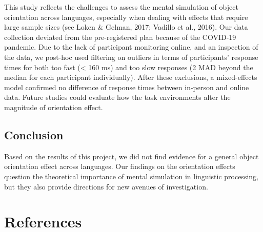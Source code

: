 \documentclass[
  man,floatsintext]{apa7}
\begin{document}
This study reflects the challenges to assess the mental simulation of
object orientation across languages, especially when dealing with
effects that require large sample sizes (see Loken \& Gelman, 2017; Vadillo et al., 2016). Our data collection deviated from
the pre-registered plan because of the COVID-19 pandemic. Due to the
lack of participant monitoring online, and an inspection of the data, we
post-hoc used filtering on outliers in terms of participants' response
times for both too fast (\textless{} 160 ms) and too slow responses (2 MAD beyond
the median for each participant individually). After these exclusions, a
mixed-effects model confirmed no difference of response times between
in-person and online data. Future studies could evaluate how the task
environments alter the magnitude of orientation effect.

\hypertarget{conclusion}{%
\subsection{Conclusion}\label{conclusion}}

Based on the results of this project, we did not find evidence for a
general object orientation effect across languages. Our findings on the
orientation effects question the theoretical importance of mental
simulation in linguistic processing, but they also provide directions
for new avenues of investigation.

\newpage

\hypertarget{references}{%
\section{References}\label{references}}
\end{document}
